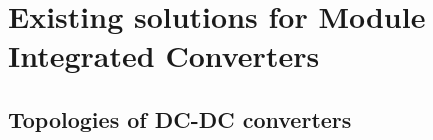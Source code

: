 \chapter{Existing solutions for Module Integrated Converters}\label{background}



\section{Topologies of DC-DC converters}\label{DC_DC_Converters}





